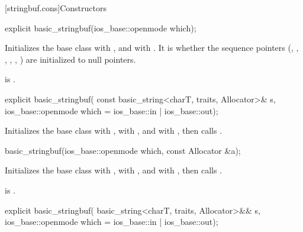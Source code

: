[stringbuf.cons]{Constructors}

%
\begin{itemdecl}
explicit basic_stringbuf(ios_base::openmode which);
\end{itemdecl}

\begin{itemdescr}
\pnum
\effects
Initializes the base class with
, and
with .
It is
whether the sequence pointers
(, , ,
, , )
are initialized to null pointers.

\pnum
\ensures
{} is .
\end{itemdescr}

%
\begin{itemdecl}
explicit basic_stringbuf(
  const basic_string<charT, traits, Allocator>& s,
  ios_base::openmode which = ios_base::in | ios_base::out);
\end{itemdecl}

\begin{itemdescr}
\pnum
\effects
Initializes the base class with
,
 with , and
 with ,
then calls .
\end{itemdescr}

%
\begin{itemdecl}
basic_stringbuf(ios_base::openmode which, const Allocator &a);
\end{itemdecl}

\begin{itemdescr}
\pnum
\effects
Initializes the base class with
,
 with , and
 with ,
then calls .

\pnum
\ensures
{} is .
\end{itemdescr}

%
\begin{itemdecl}
explicit basic_stringbuf(
  basic_string<charT, traits, Allocator>&& s,
  ios_base::openmode which = ios_base::in | ios_base::out);
\end{itemdecl}

